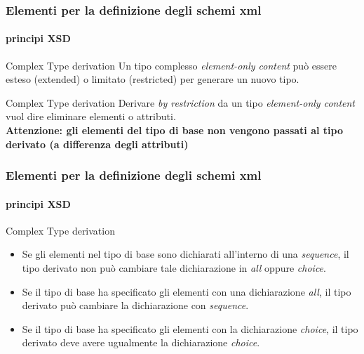 \begin{frame}
	\frametitle{Elementi per la definizione degli schemi xml}
	\framesubtitle{principi XSD}
	\addtocounter{nframe}{1}

	\begin{block}{Complex Type derivation}
		Un tipo complesso \textit{element-only content} può essere esteso (extended) o limitato (restricted) per generare un nuovo tipo.
	\end{block}

	\begin{block}{Complex Type derivation}
		Derivare \textit{by restriction} da un tipo \textit{element-only content} vuol dire eliminare elementi o attributi.
		\\\textbf{Attenzione: gli elementi del tipo di base non vengono passati al tipo derivato (a differenza degli attributi)}
	\end{block}
\end{frame}


\begin{frame}
	\frametitle{Elementi per la definizione degli schemi xml}
	\framesubtitle{principi XSD}
	\addtocounter{nframe}{1}

	
	\begin{block}{Complex Type derivation}
		\begin{itemize}
			\item Se gli elementi nel tipo di base sono dichiarati all'interno di una \textit{sequence}, il tipo derivato non può cambiare tale dichiarazione in \textit{all} oppure \textit{choice}.
			\item Se il tipo di base ha specificato gli elementi con una dichiarazione \textit{all}, il tipo derivato può cambiare la dichiarazione con \textit{sequence}. 
			\item Se il tipo di base ha specificato gli elementi con la dichiarazione \textit{choice}, il tipo derivato deve avere ugualmente la dichiarazione \textit{choice}.
		\end{itemize}
	\end{block}
\end{frame}

